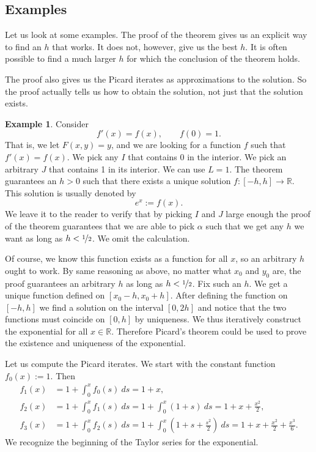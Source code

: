 \documentclass[12pt]{book}
\newcommand{\R}{{\mathbb{R}}}
\theoremstyle{plain}
\theoremstyle{remark}
\theoremstyle{definition}
\theoremstyle{exercise}
\theoremstyle{example}
\newtheorem{example}[thm]{Example}
\begin{document}
\subsection{Examples}

Let us look at some examples.  The proof of the theorem 
gives us an explicit way to find an $h$ that works.  It does not, however, give
us the best $h$.  It is often possible to find a much larger $h$ for
which the conclusion of the theorem holds.

The proof also gives us the Picard iterates as approximations to the
solution.  So the proof actually tells us how to obtain
the solution, not just that the solution exists.

\begin{example}
Consider
\begin{equation*}
f'(x) = f(x), \qquad f(0) = 1 .
\end{equation*}
That is, we let $F(x,y) = y$, and we are looking for a function 
$f$ such that $f'(x) = f(x)$.  We pick any $I$ that contains 0
in the interior.
We pick an arbitrary $J$ that contains 1 in its interior.  We can
use $L = 1$.
The theorem guarantees an $h > 0$ such that
there exists a unique solution $f \colon [-h,h] \to \R$.  This solution
is usually denoted by
\begin{equation*}
e^x := f(x) .
\end{equation*}
We leave it to the reader to verify that by picking $I$ and $J$
large enough the proof of the theorem guarantees that
we are able to pick $\alpha$ such that we get any
$h$ we want as long as $h < \nicefrac{1}{2}$.  We omit the calculation.

Of course, we know %
this function exists
as a function for all $x$, so an arbitrary $h$ ought to work.
By same reasoning as above,
no matter what $x_0$ and $y_0$ are,
the proof guarantees an arbitrary $h$ as long as $h < \nicefrac{1}{2}$.
Fix such an $h$.
We get a unique function defined on $[x_0-h,x_0+h]$.  After defining the
function on $[-h,h]$ we find a solution on the interval $[0,2h]$
and notice that the two functions must coincide on $[0,h]$ by uniqueness.
We thus iteratively construct the exponential for all $x \in \R$.
Therefore Picard's theorem could be used to prove the existence and uniqueness
of the exponential.

Let us compute the Picard iterates.
We start with the constant function $f_0(x) := 1$.  Then
\begin{align*}
f_1(x) & = 1 + \int_0^x f_0(s)~ds =
1+x, \\
f_2(x) & = 1 + \int_0^x f_1(s)~ds =
1 + \int_0^x (1+s)~ds = 1 + x + \frac{x^2}{2}, \\
f_3(x) & = 1 + \int_0^x f_2(s)~ds =
1 + \int_0^x \left(1+ s + \frac{s^2}{2} \right)~ds =
1 + x + \frac{x^2}{2} + \frac{x^3}{6} .
\end{align*}
We recognize the beginning of the Taylor series for the exponential.
\end{example}
\end{document}
